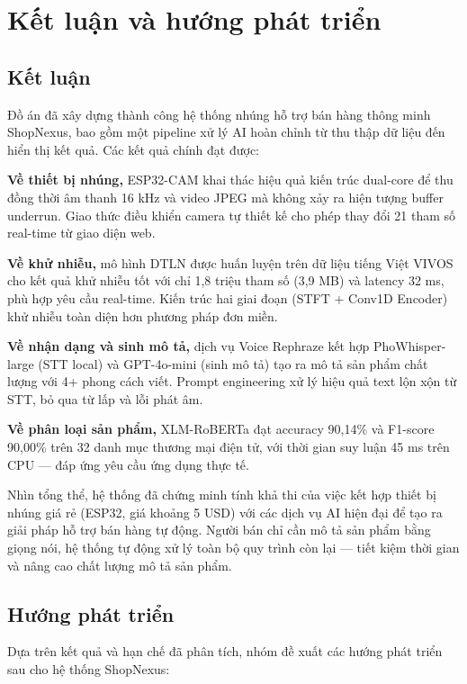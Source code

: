 \chapter{Kết luận và hướng phát triển}

\section{Kết luận}

Đồ án đã xây dựng thành công hệ thống nhúng hỗ trợ bán hàng thông minh
ShopNexus, bao gồm một pipeline xử lý AI hoàn chỉnh từ thu thập dữ liệu
đến hiển thị kết quả. Các kết quả chính đạt được:

\textbf{Về thiết bị nhúng,} ESP32-CAM khai thác hiệu quả kiến trúc dual-core
để thu đồng thời âm thanh 16 kHz và video JPEG mà không xảy ra hiện tượng
buffer underrun. Giao thức điều khiển camera tự thiết kế cho phép thay đổi
21 tham số real-time từ giao diện web.

\textbf{Về khử nhiễu,} mô hình DTLN được huấn luyện trên dữ liệu tiếng Việt
VIVOS cho kết quả khử nhiễu tốt với chỉ 1,8 triệu tham số (3,9 MB) và
latency 32 ms, phù hợp yêu cầu real-time. Kiến trúc hai giai đoạn
(STFT + Conv1D Encoder) khử nhiễu toàn diện hơn phương pháp đơn miền.

\textbf{Về nhận dạng và sinh mô tả,} dịch vụ Voice Rephraze kết hợp
PhoWhisper-large (STT local) và GPT-4o-mini (sinh mô tả) tạo ra mô tả sản phẩm
chất lượng với 4+ phong cách viết. Prompt engineering xử lý hiệu quả text
lộn xộn từ STT, bỏ qua từ lấp và lỗi phát âm.

\textbf{Về phân loại sản phẩm,} XLM-RoBERTa đạt accuracy 90,14\% và F1-score
90,00\% trên 32 danh mục thương mại điện tử, với thời gian suy luận 45 ms
trên CPU --- đáp ứng yêu cầu ứng dụng thực tế.

Nhìn tổng thể, hệ thống đã chứng minh tính khả thi của việc kết hợp thiết bị
nhúng giá rẻ (ESP32, giá khoảng 5 USD) với các dịch vụ AI hiện đại để tạo ra
giải pháp hỗ trợ bán hàng tự động. Người bán chỉ cần mô tả sản phẩm bằng
giọng nói, hệ thống tự động xử lý toàn bộ quy trình còn lại --- tiết kiệm
thời gian và nâng cao chất lượng mô tả sản phẩm.

\section{Hướng phát triển}

Dựa trên kết quả và hạn chế đã phân tích, nhóm đề xuất các hướng phát triển
sau cho hệ thống ShopNexus:

